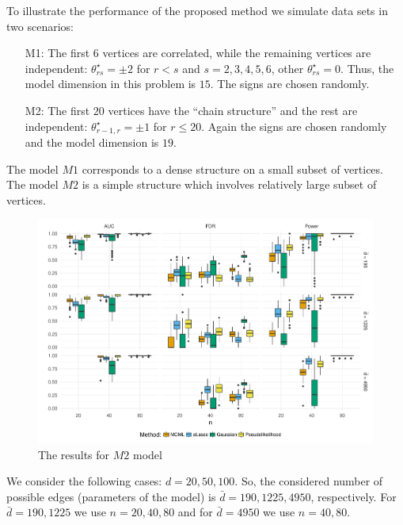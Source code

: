 \documentclass[twoside,11pt]{article}
\def\th{\theta}
\def\ths{\th^\star}
\begin{document}
To illustrate the performance of the proposed method we simulate  data sets in two scenarios:
\begin{itemize}
 \item[M1:]  The first $6$ vertices are correlated, while the remaining vertices are independent: $\ths _{rs}=\pm 2$ for $r<s$ and $s=2,3,4,5,6$, other $\ths _{rs}=0$.
 Thus, the model dimension in this problem is $15$. The signs are chosen randomly.
 \item[M2:]  The first $20$ vertices have the ``chain structure'' and the rest are independent: $\ths _{r-1,r}=\pm 1$ for $r\leq 20$. Again the signs are chosen randomly 
 and the model dimension is $19.$
 \end{itemize}
The model $M1$ corresponds to a dense structure on a  small subset of vertices. The model $M2$ is a simple structure which involves relatively large subset of vertices.


\begin{figure}[htb]
 \centering
 \includegraphics[width=\textwidth]{boxplot_chain}
 \caption{The results for $M2$ model}
 \label{fig:M2}
\end{figure}

We consider the following cases: $d=20,50,100$. So, the considered  number of possible edges (parameters of the model) is $\bar d = 190, 1225, 4950$, respectively. 
For $\bar d=190,1225$ we use  $n=20,40,80$ and for $\bar d=4950$ we use $n=40,80$.
\end{document}

